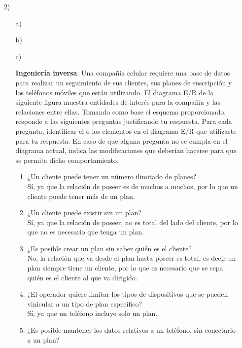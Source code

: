 \documentclass[a4paper, 12pt]{report}
\begin{document}
\begin{enumerate}
{\begin{enumerate}
\end{enumerate}
}
\item[2)]{
\begin{enumerate}
    \item[a)]{}
    \item[b)]{}
    \item[c)]{\textbf{Ingeniería inversa}:
        Una compañía celular requiere una base de datos para realizar
        un seguimiento de sus clientes, sus planes de suscripción y
        los teléfonos móviles que  están  utilizando.  El diagrama
        E/R de  la  siguiente figura  muestra  entidades  de  interés
        para  la  compañía  y  las  relaciones  entre  ellas.
        Tomando  como base el esquema proporcionado, responde a las
        siguientes preguntas justificando tu respuesta. Para cada
        pregunta, identificar el o los elementos en el diagrama E/R
        que utilizaste para tu respuesta. En caso de que alguna
        pregunta no se cumpla en el diagrama actual, indica las
        modificaciones que deberían hacerse para que se permita dicho
        comportamiento.\\
        \begin{enumerate}
            \item ¿Un cliente puede tener un número ilimitado de planes?\\
            Sí, ya que la relación de poseer es de muchos a muchos, por
            lo que un cliente puede tener más de un plan.
            \item ¿Un cliente puede existir sin un plan?\\
            Sí, ya que la relación de poseer, no es total del lado del
            cliente, por lo que no es necesario que tenga un plan.
            \item ¿Es posible crear un plan sin saber quién es el
            cliente?\\
            No, la relación que va desde el plan hasta poseer es total,
            es decir un plan siempre tiene un cliente, por lo que es
            necesario que se sepa quién es el cliente al que va
            dirigido.
            \item ¿El operador quiere limitar los tipos de dispositivos
            que se pueden vinicular a un tipo de plan específico?\\
            Sí, ya que un teléfono incluye solo un plan.
            \item ¿Es posible mantener los datos relativos a un
            teléfono, sin conectarlo a un plan?\\

\end{enumerate}}
\end{enumerate}}
\end{enumerate}
\end{document}
